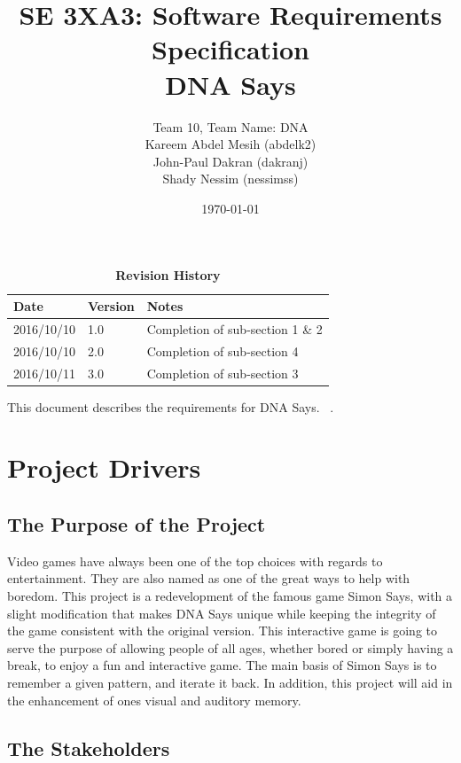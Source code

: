 \documentclass[12pt, titlepage]{article}
\title{SE 3XA3: Software Requirements Specification\\DNA Says}
\author{Team 10, Team Name: DNA
		\\ Kareem Abdel Mesih (abdelk2)
		\\ John-Paul Dakran (dakranj)
		\\ Shady Nessim (nessimss)
}
\date{\today}
\begin{document}
\maketitle

\tableofcontents
\listoftables
\listoffigures

\begin{table}[bp]
\caption{\bf Revision History}
\begin{tabularx}{\textwidth}{p{3cm}p{2cm}X}
\toprule {\bf Date} & {\bf Version} & {\bf Notes}\\
\midrule
2016/10/10 & 1.0 & Completion of sub-section 1 \& 2\\
2016/10/10 & 2.0 & Completion of sub-section 4 \\
2016/10/11 & 3.0 & Completion of sub-section 3 \\
\bottomrule
\end{tabularx}
\end{table}

\newpage


This document describes the requirements for DNA Says. ~\citep{RobertsonAndRobertson2012}.

\section{Project Drivers}

\subsection{The Purpose of the Project}
Video games have always been one of the top choices with regards to entertainment. They are also named as one of the great ways to help with boredom. This project is a redevelopment of the famous game Simon Says, with a slight modification that makes DNA Says unique while keeping the integrity of the game consistent with the original version. This interactive game is going to serve the purpose of allowing people of all ages, whether bored or simply having a break, to enjoy a fun and interactive game. The main basis of Simon Says is to remember a given pattern, and iterate it back. In addition, this project will aid in the enhancement of ones visual and auditory memory.
\subsection{The Stakeholders}
\end{document}
